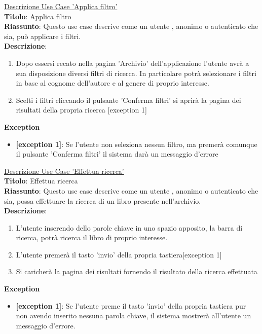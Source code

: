 \documentclass{article}
\begin{document}
\noindent\underline{Descrizione Use Case 'Applica filtro'}\\
    \textbf{Titolo}: Applica filtro\\
    \textbf{Riassunto}: Questo use case descrive come un utente , anonimo o autenticato che sia, può applicare i filtri.\\
    \textbf{Descrizione}: 
    \begin{enumerate}
        \item Dopo essersi recato nella pagina 'Archivio' dell'applicazione l'utente avrà a sua disposizione diversi filtri di ricerca. In particolare potrà selezionare i filtri in base al cognome dell'autore e al genere di proprio interesse.
        \item Scelti i filtri cliccando il pulsante 'Conferma filtri' si aprirà la pagina dei risultati della propria ricerca [exception 1]
    \end{enumerate}
    \textbf{Exception}
    \begin{itemize}
        \item \textbf{[exception 1]}: Se l'utente non seleziona nessun filtro, ma premerà comunque il pulsante 'Conferma filtri' il sistema darà un messaggio d'errore
    \end{itemize}
    
    \noindent\underline{Descrizione Use Case 'Effettua ricerca'}\\
    \textbf{Titolo}: Effettua ricerca\\
    \textbf{Riassunto}: Questo use case descrive come un utente , anonimo o autenticato che sia, possa effettuare la ricerca di un libro presente nell'archivio.\\
    \textbf{Descrizione}: 
    \begin{enumerate}
        \item L'utente inserendo dello parole chiave in uno spazio apposito, la barra di ricerca, potrà ricerca il libro di proprio interesse.
        \item L'utente premerà il tasto 'invio' della propria tastiera[exception 1]
        \item Si caricherà la pagina dei risultati fornendo il risultato della ricerca effettuata
    \end{enumerate}
        \textbf{Exception}
    \begin{itemize}
        \item \textbf{[exception 1]}: Se l'utente preme il tasto 'invio' della propria tastiera pur non avendo inserito nessuna parola chiave, il sistema mostrerà all'utente un messaggio d'errore.
    \end{itemize}
\end{document}
